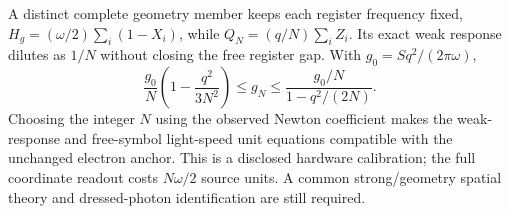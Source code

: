 A distinct complete geometry member keeps each register frequency fixed,
$H_g=(\omega/2)\sum_i(1-X_i)$, while
$Q_N=(q/N)\sum_i Z_i$. Its exact weak response dilutes as $1/N$ without
closing the free register gap. With $g_0=S q^2/(2\pi\omega)$,
\[
 \frac{g_0}{N}\left(1-\frac{q^2}{3N^2}\right)
 \le g_N\le\frac{g_0/N}{1-q^2/(2N)}.
\]
Choosing the integer $N$ using the observed Newton coefficient makes the
weak-response and free-symbol light-speed unit equations compatible with
the unchanged electron anchor. This is a disclosed hardware calibration;
the full coordinate readout costs $N\omega/2$ source units. A common
strong/geometry spatial theory and dressed-photon identification are still
required.
